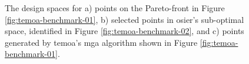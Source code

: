 \newpage
\begin{figure}[ht!]
  \centering
  \resizebox{\columnwidth}{!}{}
  \caption{The design spaces for a) points on the Pareto-front in Figure
  \ref{fig:temoa-benchmark-01}, b) selected points in \ac{osier}'s sub-optimal
  space, identified in Figure \ref{fig:temoa-benchmark-02}, and c) points
  generated by \ac{temoa}'s \ac{mga} algorithm shown in Figure
  \ref{fig:temoa-benchmark-01}.}
  \label{fig:temoa-benchmark-03}
\end{figure}

